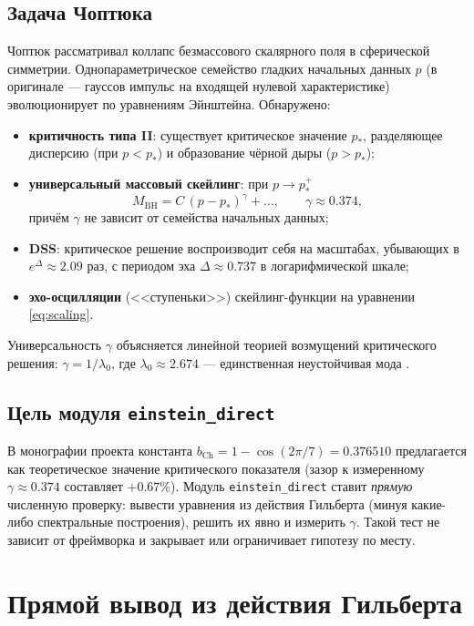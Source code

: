 \documentclass[11pt,a4paper]{article}
\begin{document}
\subsection{Задача Чоптюка}
Чоптюк \cite{choptuik1993} рассматривал коллапс безмассового скалярного поля в
сферической симметрии. Однопараметрическое семейство гладких начальных данных
$p$ (в оригинале --- гауссов импульс на входящей нулевой характеристике)
эволюционирует по уравнениям Эйнштейна. Обнаружено:
\begin{itemize}
\item \textbf{критичность типа II}: существует критическое значение $p_*$,
разделяющее дисперсию (при $p<p_*$) и образование чёрной дыры ($p>p_*$);
\item \textbf{универсальный массовый скейлинг}: при $p\to p_*^+$
\begin{equation}
M_{\mathrm{BH}}=C\,(p-p_*)^{\gamma}+\ldots,\qquad \gamma\approx0.374,
\label{eq:scaling}
\end{equation}
причём $\gamma$ не зависит от семейства начальных данных;
\item \textbf{DSS}: критическое решение воспроизводит себя на масштабах,
убывающих в $e^{\Delta}\approx2.09$ раз, с периодом эха $\Delta\approx0.737$
в логарифмической шкале;
\item \textbf{эхо-осцилляции} (<<ступеньки>>) скейлинг-функции на
уравнении \eqref{eq:scaling}.
\end{itemize}
Универсальность $\gamma$ объясняется линейной теорией возмущений критического
решения: $\gamma=1/\lambda_0$, где $\lambda_0\approx2.674$ ---
единственная неустойчивая мода \cite{gundlach2007}.

\subsection{Цель модуля \texttt{einstein\_direct}}
В монографии проекта \cite{isaev2024} константа $b_{\mathrm{Ch}}=
1-\cos(2\pi/7)=0.376510$ предлагается как теоретическое значение критического
показателя (зазор к измеренному $\gamma\approx0.374$ составляет $+0.67\%$).
Модуль \texttt{einstein\_direct} ставит \emph{прямую} численную проверку:
вывести уравнения из действия Гильберта (минуя какие-либо спектральные
построения), решить их явно и измерить $\gamma$. Такой тест не зависит от
фреймворка и закрывает или ограничивает гипотезу по месту.

\section{Прямой вывод из действия Гильберта}
\end{document}
